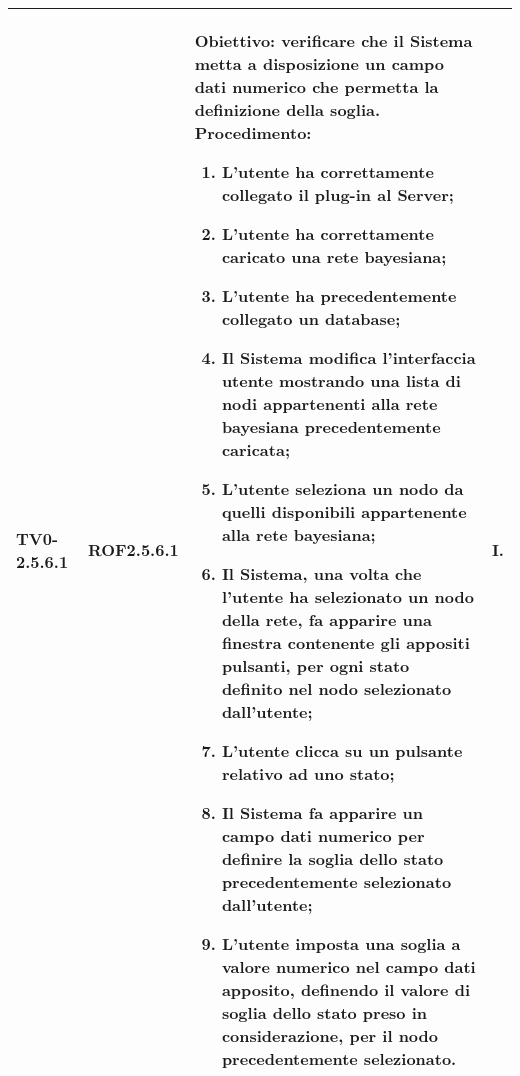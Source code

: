 \begin{longtable}{|C{.15\textwidth}|C{.13\textwidth}|m{.52\textwidth}|C{.08\textwidth}|}
TV0-2.5.6.1 & ROF2.5.6.1 &
	\textbf{Obiettivo}: verificare che il Sistema metta a disposizione un campo dati numerico che permetta la definizione della soglia. \newline
	\textbf{Procedimento}:
	\begin{enumerate}
		\item L'utente ha correttamente collegato il plug-in al Server;
		\item L'utente ha correttamente caricato una rete bayesiana;
		\item L'utente ha precedentemente collegato un database;
		\item Il Sistema modifica l'interfaccia utente mostrando una lista di nodi appartenenti alla rete bayesiana precedentemente caricata;
		\item L'utente seleziona un nodo da quelli disponibili appartenente alla rete bayesiana;
		\item Il Sistema, una volta che l'utente ha selezionato un nodo della rete, fa apparire una finestra contenente gli appositi pulsanti, per ogni stato definito nel nodo selezionato dall'utente;
		\item L'utente clicca su un pulsante relativo ad uno stato;
		\item Il Sistema fa apparire un campo dati numerico per definire la soglia dello stato precedentemente selezionato dall'utente;
		\item L'utente imposta una soglia a valore numerico nel campo dati apposito, definendo il valore di soglia dello stato preso in considerazione, per il nodo precedentemente selezionato.
	\end{enumerate}
	& I. \\
\hline


\end{longtable}
